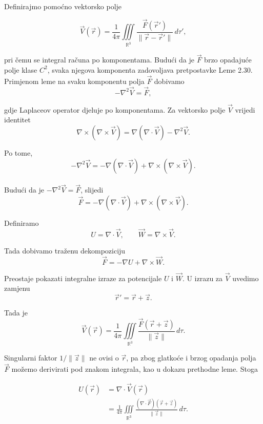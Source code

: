 \documentclass[12pt,a4paper]{article}
\makeatletter
\renewenvironment{proof}[1][\proofname]{\par
  \pushQED{\qed}%
  \normalfont
  \topsep6\p@\@plus6\p@\relax
  \trivlist
  \item[\hskip\labelsep
  \bfseries #1\@addpunct{.}]\ignorespaces
}{%
  \popQED\endtrivlist\@endpefalse
}
\makeatother
\begin{document}
\begin{proof} 
Definirajmo pomoćno vektorsko polje

$$ \overrightarrow{V}(\overrightarrow{r}) = \frac{1}{4\pi} \iiint\limits_{\mathbb{R}^3} \frac{\overrightarrow{F}(\overrightarrow{r}')} {\|\overrightarrow{r}-\overrightarrow{r}'\|}\,d\tau', $$

pri čemu se integral računa po komponentama. Budući da je \(\overrightarrow{F}\) brzo opadajuće polje klase \(C^2\), svaka njegova komponenta zadovoljava pretpostavke Leme 2.30. Primjenom leme na svaku komponentu polja \(\overrightarrow{F}\) dobivamo
$$ -\nabla^2\overrightarrow{V}=\overrightarrow{F}, $$

gdje Laplaceov operator djeluje po komponentama. Za vektorsko polje \(\overrightarrow{V}\) vrijedi identitet
$$ \nabla\times(\nabla\times\overrightarrow{V}) = \nabla(\nabla\cdot\overrightarrow{V})-\nabla^2\overrightarrow{V}. $$

Po tome,
$$ -\nabla^2\overrightarrow{V} = -\nabla(\nabla\cdot\overrightarrow{V}) + \nabla\times(\nabla\times\overrightarrow{V}). $$\\
Budući da je \(-\nabla^2\overrightarrow{V}=\overrightarrow{F}\), slijedi
$$ \overrightarrow{F} = -\nabla(\nabla\cdot\overrightarrow{V}) + \nabla\times(\nabla\times\overrightarrow{V}). $$

Definiramo
$$ U=\nabla\cdot\overrightarrow{V}, \qquad \overrightarrow{W}=\nabla\times\overrightarrow{V}. $$

Tada dobivamo traženu dekompoziciju
$$  \overrightarrow{F}=-\nabla U+\nabla\times\overrightarrow{W}.  $$

Preostaje pokazati integralne izraze za potencijale \(U\) i \(\overrightarrow{W}\). U izrazu za \(\overrightarrow{V}\) uvedimo zamjenu
$$ \overrightarrow{r}'=\overrightarrow{r}+\overrightarrow{z}. $$

Tada je
$$ \overrightarrow{V}(\overrightarrow{r}) = \frac{1}{4\pi} \iiint\limits_{\mathbb{R}^3} \frac{\overrightarrow{F}(\overrightarrow{r}+\overrightarrow{z})} {\|\overrightarrow{z}\|}\,d\tau. $$

Singularni faktor \(1/\|\overrightarrow{z}\|\) ne ovisi o \(\overrightarrow{r}\), pa zbog glatkoće i brzog opadanja polja \(\overrightarrow{F}\) možemo derivirati pod znakom integrala, kao u dokazu prethodne leme. Stoga

$$ \begin{aligned} U(\overrightarrow{r}) &=\nabla\cdot\overrightarrow{V}(\overrightarrow{r})\\ &= \frac{1}{4\pi} \iiint\limits_{\mathbb{R}^3} \frac{(\nabla\cdot\overrightarrow{F})(\overrightarrow{r}+\overrightarrow{z})} {\|\overrightarrow{z}\|}\,d\tau. \end{aligned} $$


\end{proof}
\end{document}
